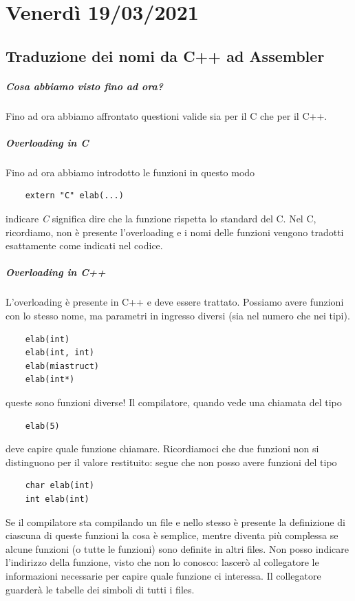 \chapter{Venerdì 19/03/2021}

\section{Traduzione dei nomi da C++ ad Assembler}
\paragraph{Cosa abbiamo visto fino ad ora?} Fino ad ora abbiamo affrontato questioni valide sia per il C che per il C++.
\paragraph{Overloading in C} Fino ad ora abbiamo introdotto le funzioni in questo modo
\begin{verbatim}
	extern "C" elab(...)
\end{verbatim}
indicare \emph{C} significa dire che la funzione rispetta lo standard del C. Nel C, ricordiamo, non è presente l'overloading e i nomi delle funzioni vengono tradotti esattamente come indicati nel codice.
\paragraph{Overloading in C++} L'overloading è presente in C++ e deve essere trattato. Possiamo avere funzioni con lo stesso nome, ma parametri in ingresso diversi (sia nel numero che nei tipi).
\begin{verbatim}
	elab(int)
	elab(int, int)
	elab(miastruct)
	elab(int*)
\end{verbatim}
queste sono funzioni diverse! Il compilatore, quando vede una chiamata del tipo
\begin{verbatim}
	elab(5)
\end{verbatim}
deve capire quale funzione chiamare. Ricordiamoci che due funzioni non si distinguono per il valore restituito: segue che non posso avere funzioni del tipo
\begin{verbatim}
	char elab(int)
	int elab(int)
\end{verbatim}
Se il compilatore sta compilando un file e nello stesso è presente la definizione di ciascuna di queste funzioni la cosa è semplice, mentre diventa più complessa se alcune funzioni (o tutte le funzioni) sono definite in altri files. Non posso indicare l'indirizzo della funzione, visto che non lo conosco: lascerò al collegatore le informazioni necessarie per capire quale funzione ci interessa. Il collegatore guarderà le tabelle dei simboli di tutti i files. 
